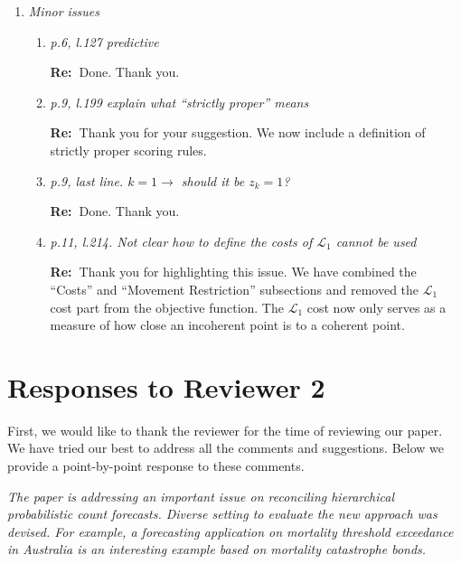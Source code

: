 \documentclass[11pt,a4paper]{article}
\newcommand{\RE}[2][Re:~]{{\color{blue}\textbf{#1}#2}}
\begin{document}
\begin{enumerate}
\begin{enumerate}
    \RE{We thank the reviewer for the very nice suggestion. We have combined the ``Costs'' and ``Movement Restriction'' subsections and removed the $\mathcal{L}_1$ cost part from the objective function. The $\mathcal{L}_1$ cost now only serves as a measure of how close an incoherent point is to a coherent point.}

\end{enumerate}




\item \textit{ Minor issues }

  \begin{enumerate}
    \item  \textit{p.6, l.127 predictive}

    \RE{Done. Thank you.}

    \item \textit{p.9, l.199 explain what ``strictly proper'' means}

    \RE{Thank you for your suggestion. We now include a definition of strictly proper scoring rules.}



    \item \textit{p.9, last line. $k = 1 \rightarrow$ should it be $z_k = 1$?}
    
    \RE{Done. Thank you.}
    \item \textit{p.11, l.214. Not clear how to define the costs of $\mathcal{L}_1$ cannot be used}
    
    \RE{Thank you for highlighting this issue. We have combined the ``Costs'' and ``Movement Restriction'' subsections and removed the $\mathcal{L}_1$ cost part from the objective function. The $\mathcal{L}_1$ cost now only serves as a measure of how close an incoherent point is to a coherent point.}

  \end{enumerate}

\end{enumerate}
\newpage
\section*{Responses to Reviewer 2}\label{reviewer-2-comments}

\RE[]{First, we would like to thank the reviewer for the time of reviewing our paper. We have tried our best to address all the comments and suggestions. Below we provide a point-by-point response to these comments.}

\textit{The paper is addressing an important issue on reconciling hierarchical probabilistic count forecasts. Diverse setting to evaluate the new approach was devised. For example, a forecasting application on mortality threshold exceedance in Australia is an interesting example based on mortality catastrophe bonds.}
\end{document}
